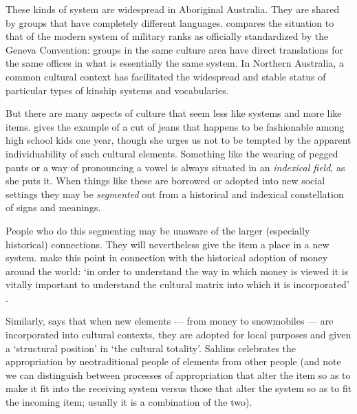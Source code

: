 These kinds of system are widespread in Aboriginal Australia. They are shared by 
groups that have completely different languages. \citet{evans_enigma_2012} compares the 
situation to that of the modern system of military ranks as officially 
standardized by the Geneva Convention: groups in the same culture area have direct translations for the same offices in what is essentially the same system. In Northern Australia, a common cultural context has 
facilitated the widespread and stable status of particular types of 
kinship systems and vocabularies. 



But there are many aspects of culture that seem less 
like systems and more like items. \citet{eckert_variation_2008} gives the example of a cut of 
jeans that happens to be fashionable among high school kids one year, though she urges us not to be tempted by the apparent individuability of 
such cultural elements. Something like the wearing of pegged pants or a 
way of pronouncing a vowel is always situated in an \textit{indexical 
field}, as she puts it. When things like these are borrowed or adopted into new 
social settings they may be \textit{segmented} out from a historical and 
indexical constellation of signs and meanings. 



People who do this segmenting may be unaware of the larger (especially 
historical) connections. They will nevertheless give the item a 
place in a new system. \citet{parry_money_1989} make this point in connection with the historical adoption of money around the world: \textquoteleft in 
order to understand the way in which money is viewed it is vitally 
important to understand the cultural matrix into which it is 
incorporated' \citep[1]{parry_money_1989}.



Similarly, \citet{sahlins_what_1999} says that when new elements --- from 
money to snowmobiles --- are incorporated into cultural contexts, they are 
adopted for local purposes and given a \textquoteleft structural position' in \textquoteleft the 
cultural totality'. Sahlins celebrates the appropriation 
by neotraditional people of elements from other people 
(and note we can distinguish between processes of appropriation that 
alter the item so as to make it fit into the receiving system versus 
those that alter the system so as to fit the incoming item; usually it is a combination of the two). 



